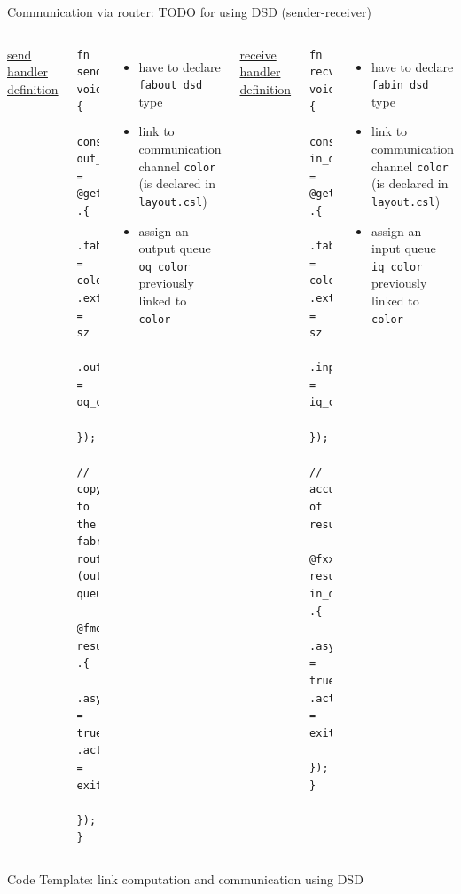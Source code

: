 \documentclass[dvipdfmx, 11pt, aspectratio=169]{beamer}   %
\begin{document}
\begin{frame}[fragile]{Communication via router: TODO for using DSD (sender-receiver)}
\begin{columns}
\uline{send handler definition}
\begin{lstlisting}[language=CSL, basicstyle=\ttfamily\tiny]
fn send() void {
    const out_dsd = @get_dsd(fabout_dsd, .{
        .fabric_color = color, .extent = sz
        .output_queue = oq_color
    });
    // copy to the fabric router (output queue)
    @fmovs(out_dsd, result_dsd, .{
        .async = true, .activate = exit_task_id 
    });
}
\end{lstlisting}
\begin{itemize}
    \item have to declare \lstinline|fabout_dsd| type
    \item link to communication channel \lstinline|color| (is declared in \lstinline|layout.csl|)
    \item assign an output queue \lstinline|oq_color| previously linked to \lstinline|color|
\end{itemize}
\uline{receive handler definition}
\begin{lstlisting}[language=CSL, basicstyle=\ttfamily\tiny]
fn recv() void {
    const in_dsd = @get_dsd(fabin_dsd, .{
        .fabric_color = color, .extent = sz
        .input_queue = iq_color
    });
    // accumulation of results
    @fxxx(result_dsd, result_dsd, in_dsd, .{
        .async = true, .activate = exit_task_id 
    });
}
\end{lstlisting}
\begin{itemize}
    \item have to declare \lstinline|fabin_dsd| type
    \item link to communication channel \lstinline|color| (is declared in \lstinline|layout.csl|)
    \item assign an input queue \lstinline|iq_color| previously linked to \lstinline|color|
\end{itemize}
\end{columns}
\end{frame}
\begin{frame}{Code Template: link computation and communication using DSD}

\end{frame}
\end{document}
